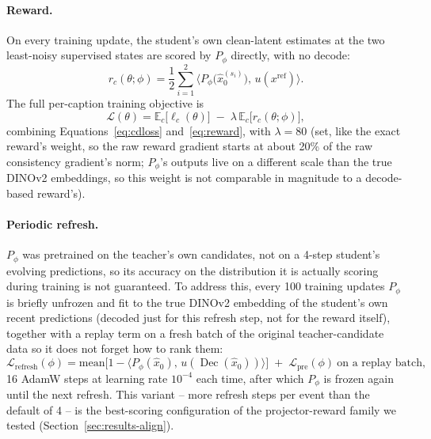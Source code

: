 \documentclass{article} %
\DeclareMathOperator{\Dec}{Dec}
\begin{document}
\paragraph{Reward.} On every training update, the student's own clean-latent estimates at the two
least-noisy supervised states are scored by $P_\phi$ directly, with no decode:
\begin{equation}
r_c(\theta;\phi)=\frac12\sum_{i=1}^{2}\big\langle P_\phi\big(\hat x_0^{(s_i)}\big),\,u(x^{\mathrm{ref}})\big\rangle .
\label{eq:reward}
\end{equation}
The full per-caption training objective is
\begin{equation}
\mathcal L(\theta)=\mathbb E_c\big[\ell_c(\theta)\big]\;-\;\lambda\,\mathbb E_c\big[r_c(\theta;\phi)\big] ,
\label{eq:objective}
\end{equation}
combining Equations~\ref{eq:cdloss} and~\ref{eq:reward}, with $\lambda{=}80$ (set, like the exact
reward's weight, so the raw reward gradient starts at about 20\% of the raw consistency gradient's
norm; $P_\phi$'s outputs live on a different scale than the true DINOv2 embeddings, so this weight
is not comparable in magnitude to a decode-based reward's).

\paragraph{Periodic refresh.} $P_\phi$ was pretrained on the teacher's own candidates, not on a
4-step student's evolving predictions, so its accuracy on the distribution it is actually scoring
during training is not guaranteed. To address this, every 100 training updates $P_\phi$ is briefly
unfrozen and fit to the true DINOv2 embedding of the student's own recent predictions (decoded just
for this refresh step, not for the reward itself), together with a replay term on a fresh batch of
the original teacher-candidate data so it does not forget how to rank them:
\begin{equation}
\mathcal L_{\mathrm{refresh}}(\phi)=\mathrm{mean}\big[1-\langle P_\phi(\hat x_0),\,u(\Dec(\hat x_0))\rangle\big]\;+\;\mathcal L_{\mathrm{pre}}(\phi)\ \text{on a replay batch},
\label{eq:refresh}
\end{equation}
16 AdamW steps at learning rate $10^{-4}$ each time, after which $P_\phi$ is frozen again until the
next refresh. This variant -- more refresh steps per event than the default of 4 -- is the
best-scoring configuration of the projector-reward family we tested (Section~\ref{sec:results-align}).
\end{document}
